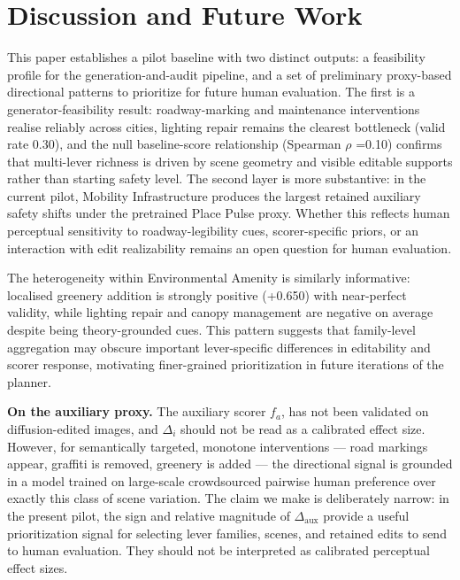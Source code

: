 \section{Discussion and Future Work}
\label{sec:discussion}

This paper establishes a pilot baseline with two distinct outputs: a feasibility profile for the generation-and-audit pipeline, and a set of preliminary proxy-based directional patterns to prioritize for future human evaluation. The first is a generator-feasibility result: roadway-marking and maintenance interventions realise reliably across cities, lighting repair remains the clearest bottleneck (valid rate 0.30), and the null baseline-score relationship (Spearman $\rho$ =0.10) confirms that multi-lever richness is driven by scene geometry and visible editable supports rather than starting safety level. The second layer is more substantive: in the current pilot, Mobility Infrastructure produces the largest retained auxiliary safety shifts under the pretrained Place Pulse proxy. Whether this reflects human perceptual sensitivity to roadway-legibility cues, scorer-specific priors, or an interaction with edit realizability remains an open question for human evaluation.

The heterogeneity within Environmental Amenity is similarly informative: localised greenery addition is strongly positive (+0.650) with near-perfect validity, while lighting repair and canopy management are negative on average despite being theory-grounded cues. This pattern suggests that family-level aggregation may obscure important lever-specific differences in editability and scorer response, motivating finer-grained prioritization in future iterations of the planner.


\noindent\textbf{On the auxiliary proxy.} The auxiliary scorer $f_a$, has not been validated on diffusion-edited images, and $\Delta_i$ should not be read as a calibrated effect size. However, for semantically targeted, monotone interventions --- road markings appear, graffiti is removed, greenery is added --- the directional signal is grounded in a model trained on large-scale crowdsourced pairwise human preference over exactly this class of scene variation. The claim we make is deliberately narrow: in the present pilot, the sign and relative magnitude of $\Delta_{\mathrm{aux}}$ provide a useful prioritization signal for selecting lever families, scenes, and retained edits to send to human evaluation. They should not be interpreted as calibrated perceptual effect sizes.



